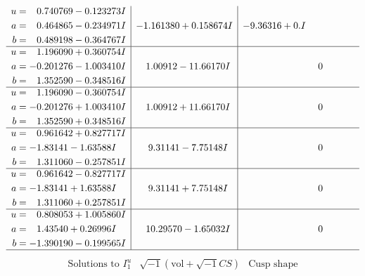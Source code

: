 \documentclass[1p]{elsarticle_modified}
\theoremstyle{definition}
\newcommand{\I}{\sqrt{-1}}
\begin{document}
$$\begin{array}{c|c|c}
\begin{aligned}
u &= \phantom{-}0.740769 - 0.123273 I \\
a &= \phantom{-}0.464865 - 0.234971 I \\
b &= \phantom{-}0.489198 - 0.364767 I\end{aligned}
 & -1.161380 + 0.158674 I & -9.36316 + 0. I\phantom{ +0.000000I} \\ \hline\begin{aligned}
u &= \phantom{-}1.196090 + 0.360754 I \\
a &= -0.201276 - 1.003410 I \\
b &= \phantom{-}1.352590 - 0.348516 I\end{aligned}
 & \phantom{-}1.00912 - 11.66170 I & \phantom{-0.000000 } 0 \\ \hline\begin{aligned}
u &= \phantom{-}1.196090 - 0.360754 I \\
a &= -0.201276 + 1.003410 I \\
b &= \phantom{-}1.352590 + 0.348516 I\end{aligned}
 & \phantom{-}1.00912 + 11.66170 I & \phantom{-0.000000 } 0 \\ \hline\begin{aligned}
u &= \phantom{-}0.961642 + 0.827717 I \\
a &= -1.83141 - 1.63588 I \\
b &= \phantom{-}1.311060 - 0.257851 I\end{aligned}
 & \phantom{-}9.31141 - 7.75148 I & \phantom{-0.000000 } 0 \\ \hline\begin{aligned}
u &= \phantom{-}0.961642 - 0.827717 I \\
a &= -1.83141 + 1.63588 I \\
b &= \phantom{-}1.311060 + 0.257851 I\end{aligned}
 & \phantom{-}9.31141 + 7.75148 I & \phantom{-0.000000 } 0 \\ \hline\begin{aligned}
u &= \phantom{-}0.808053 + 1.005860 I \\
a &= \phantom{-}1.43540 + 0.26996 I \\
b &= -1.390190 - 0.199565 I\end{aligned}
 & \phantom{-}10.29570 - 1.65032 I & \phantom{-0.000000 } 0\\
 \hline 
 \end{array}$$\newpage$$\begin{array}{c|c|c}  
\text{Solutions to }I^u_{1}& \I (\text{vol} + \sqrt{-1}CS) & \text{Cusp shape}\\

\end{array}$$
\end{document}
